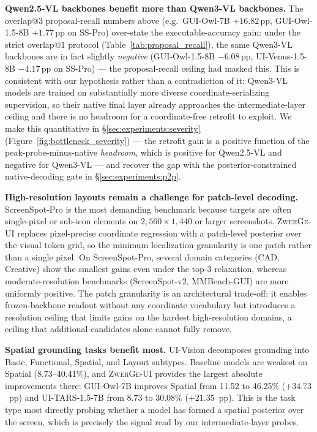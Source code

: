 \textbf{Qwen2.5-VL backbones benefit more than Qwen3-VL backbones.}
The overlap@3 proposal-recall numbers above (e.g.\ GUI-Owl-7B $+16.82$\,pp, GUI-Owl-1.5-8B $+1.77$\,pp on SS-Pro) over-state the executable-accuracy gain: under the strict overlap@1 protocol (Table~\ref{tab:proposal_recall}), the same Qwen3-VL backbones are in fact slightly \emph{negative} (GUI-Owl-1.5-8B $-6.08$\,pp, UI-Venus-1.5-8B $-4.17$\,pp on SS-Pro) --- the proposal-recall ceiling had masked this.
This is consistent with our hypothesis rather than a contradiction of it: Qwen3-VL models are trained on substantially more diverse coordinate-serializing supervision, so their native final layer already approaches the intermediate-layer ceiling and there is no headroom for a coordinate-free retrofit to exploit.
We make this quantitative in \S\ref{sec:experiments:severity} (Figure~\ref{fig:bottleneck_severity}) --- the retrofit gain is a positive function of the peak-probe-minus-native \emph{headroom}, which is positive for Qwen2.5-VL and negative for Qwen3-VL --- and recover the gap with the posterior-constrained native-decoding gate in \S\ref{sec:experiments:p2p}.

\textbf{High-resolution layouts remain a challenge for patch-level decoding.}
ScreenSpot-Pro is the most demanding benchmark because targets are often single-pixel or sub-icon elements on $2{,}560{\times}1{,}440$ or larger screenshots.
\textsc{ZwerGe-UI} replaces pixel-precise coordinate regression with a patch-level posterior over the visual token grid, so the minimum localization granularity is one patch rather than a single pixel.
On ScreenSpot-Pro, several domain categories (CAD, Creative) show the smallest gains even under the top-3 relaxation, whereas moderate-resolution benchmarks (ScreenSpot-v2, MMBench-GUI) are more uniformly positive.
The patch granularity is an architectural trade-off: it enables frozen-backbone readout without any coordinate vocabulary but introduces a resolution ceiling that limits gains on the hardest high-resolution domains, a ceiling that additional candidates alone cannot fully remove.

\textbf{Spatial grounding tasks benefit most.}
UI-Vision decomposes grounding into Basic, Functional, Spatial, and Layout subtypes.
Baseline models are weakest on Spatial (8.73--40.41\%), and \textsc{ZwerGe-UI} provides the largest absolute improvements there: GUI-Owl-7B improves Spatial from 11.52 to 46.25\% ($+34.73$~pp) and UI-TARS-1.5-7B from 8.73 to 30.08\% ($+21.35$~pp).
This is the task type most directly probing whether a model has formed a spatial posterior over the screen, which is precisely the signal read by our intermediate-layer probes.


